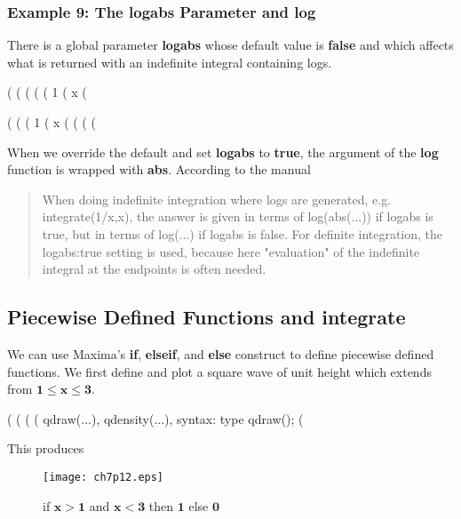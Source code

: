 \documentclass[12pt]{article}
\begin{document}
\subsubsection*{Example 9: The \textbf{logabs} Parameter and \textbf{log} }
There is a global parameter \textbf{logabs} whose default value is \textbf{false}
  and which affects what is returned with an indefinite integral containing logs.
\begin{myVerbatim}
(%
(%
(%
(%
(%
                                       1
(%
                                       x
(%
\end{myVerbatim}
\newpage
\begin{myVerbatim}
(%
(%
(%
                                       1
(%
                                       x
(%
(%
(%
(%
\end{myVerbatim} 
When we override the default and set \textbf{logabs} to \textbf{true}, the argument
  of the \textbf{log} function is wrapped with \textbf{abs}.
According to the manual
\begin{quote}
When doing indefinite integration where logs are generated, e.g. integrate(1/x,x),
 the answer is given in terms of log(abs(...)) if logabs is true,
  but in terms of log(...) if logabs is false.
For definite integration, the logabs:true setting is used,
  because here "evaluation" of the indefinite integral at
  the endpoints is often needed. 
\end{quote}
\vspace{1cm}
\subsection{Piecewise Defined Functions and \textbf{integrate} }
We can use Maxima's \textbf{if}, \textbf{elseif}, and \textbf{else} construct
  to define piecewise defined functions.
We first define and plot a square wave of unit height which extends
  from $\mathbf{1 \leq x \leq 3}$.
\begin{myVerbatim}
(%
(%
(%
(%
               qdraw(...), qdensity(...), syntax: type qdraw(); 
(%
\end{myVerbatim} 
This produces 
\begin{figure} [h]
   \centerline{\texttt{[image: ch7p12.eps]} }
	\caption{if $\mathbf{x > 1}$ and $\mathbf{x < 3}$ then $\mathbf{1}$ else $\mathbf{0}$}
\end{figure} 
%
\end{document}
